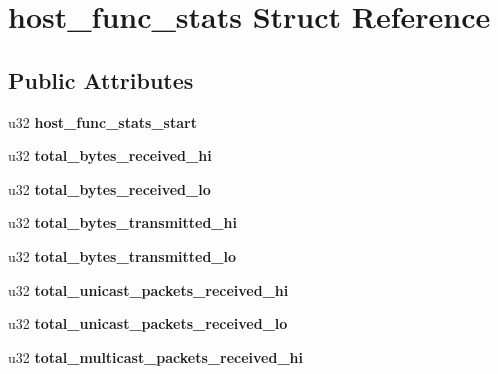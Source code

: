 \hypertarget{structhost__func__stats}{
\section{host\_\-func\_\-stats Struct Reference}
\label{structhost__func__stats}
}
\subsection*{Public Attributes}
\begin{DoxyCompactItemize}
\item 
\hypertarget{structhost__func__stats_a9ff3e442020f68dad21cba577369ed93}{
u32 {\bfseries host\_\-func\_\-stats\_\-start}}
\label{structhost__func__stats_a9ff3e442020f68dad21cba577369ed93}

\item 
\hypertarget{structhost__func__stats_adab3c10a826328a49dd52fdb117d4eb5}{
u32 {\bfseries total\_\-bytes\_\-received\_\-hi}}
\label{structhost__func__stats_adab3c10a826328a49dd52fdb117d4eb5}

\item 
\hypertarget{structhost__func__stats_a1d04f39e47448ff8428fd32c7f38f1e0}{
u32 {\bfseries total\_\-bytes\_\-received\_\-lo}}
\label{structhost__func__stats_a1d04f39e47448ff8428fd32c7f38f1e0}

\item 
\hypertarget{structhost__func__stats_a8e1b1b4ae7757466cf3a44091c81680f}{
u32 {\bfseries total\_\-bytes\_\-transmitted\_\-hi}}
\label{structhost__func__stats_a8e1b1b4ae7757466cf3a44091c81680f}

\item 
\hypertarget{structhost__func__stats_a5010714ffc84b3b0465a4207033aec90}{
u32 {\bfseries total\_\-bytes\_\-transmitted\_\-lo}}
\label{structhost__func__stats_a5010714ffc84b3b0465a4207033aec90}

\item 
\hypertarget{structhost__func__stats_ab5877acacf6a42ae9eb461434ffabd93}{
u32 {\bfseries total\_\-unicast\_\-packets\_\-received\_\-hi}}
\label{structhost__func__stats_ab5877acacf6a42ae9eb461434ffabd93}

\item 
\hypertarget{structhost__func__stats_a2df4b25561d3c7f351aa2386cd701194}{
u32 {\bfseries total\_\-unicast\_\-packets\_\-received\_\-lo}}
\label{structhost__func__stats_a2df4b25561d3c7f351aa2386cd701194}

\item 
\hypertarget{structhost__func__stats_a0eb04d4f19daf60aa58a1220998fbfdd}{
u32 {\bfseries total\_\-multicast\_\-packets\_\-received\_\-hi}}
\label{structhost__func__stats_a0eb04d4f19daf60aa58a1220998fbfdd}


\end{DoxyCompactItemize}
